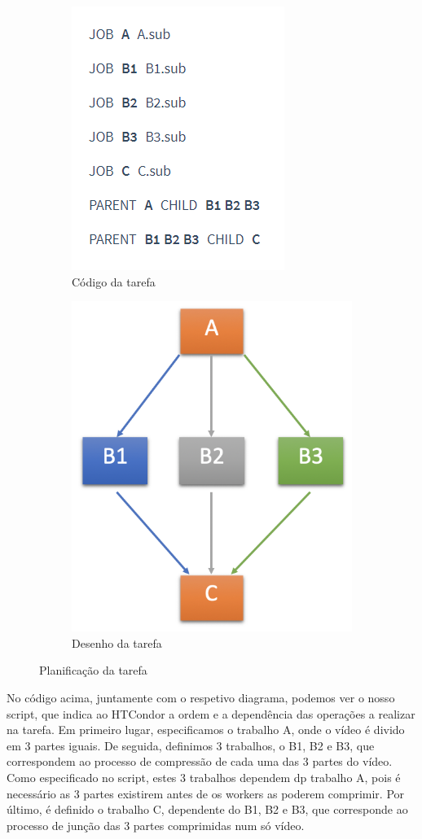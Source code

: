 \documentclass[a4paper]{report}
\begin{document}
	\begin{figure}[h]
		\centering
		\begin{subfigure}{.5\textwidth}
			\centering
			\includegraphics[width=.4\linewidth]{DAG.png}
			\caption{Código da tarefa}
			\label{fig:sub1}
		\end{subfigure}%
		\begin{subfigure}{.5\textwidth}
			\centering
			\includegraphics[width=.4\linewidth]{Arquitetura-HTCondor.png}
			\caption{Desenho da tarefa}
			\label{fig:sub2}
		\end{subfigure}
		\caption{Planificação da tarefa}
		\label{fig:dag}
	\end{figure}

	No código acima, juntamente com o respetivo diagrama, podemos ver o nosso script, que indica ao HTCondor a ordem e a dependência das operações a realizar na tarefa. Em primeiro lugar, especificamos o trabalho A, onde o vídeo é divido em 3 partes iguais. De seguida, definimos 3 trabalhos, o B1, B2 e B3, que correspondem ao processo de compressão de cada uma das 3 partes do vídeo. Como especificado no script, estes 3 trabalhos dependem dp trabalho A, pois é necessário as 3 partes existirem antes de os workers as poderem comprimir. Por último, é definido o trabalho C, dependente do B1, B2 e B3, que corresponde ao processo de junção das 3 partes comprimidas num só vídeo.
	
\end{document}

